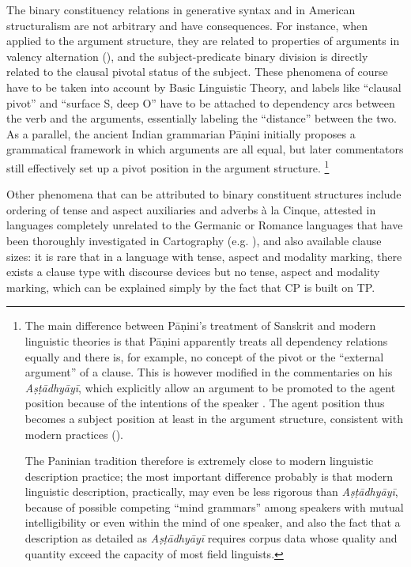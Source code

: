 \documentclass[UTF8, a4paper, oneside, scheme=plain, 12pt]{ctexrep}
\newcommand*{\citepages}[1]{pp.~{#1}}
\newcommand{\work}[1]{\textit{#1}}
\begin{document}
{The binary constituency relations in generative syntax and in American structuralism are not arbitrary and have consequences.
For instance, when applied to the argument structure,
they are related to properties of arguments in valency alternation (),
and the subject-predicate binary division is directly related to the clausal pivotal status of the subject.
These phenomena of course have to be taken into account by Basic Linguistic Theory,
and labels like ``clausal pivot'' and ``surface S, deep O'' have to be attached to dependency arcs between the verb and the arguments,
essentially labeling the ``distance'' between the two. 
As a parallel, the ancient Indian grammarian Pāṇini initially proposes a grammatical framework in which arguments are all equal, but later commentators still effectively set up a pivot position in the argument structure.%
\footnote{
    The main difference between Pāṇini's treatment of Sanskrit and modern linguistic theories
    is that Pāṇini apparently treats all dependency relations equally
    and there is, for example, no concept of the pivot or the ``external argument'' of a clause.
    This is however modified in the commentaries on his \work{Aṣṭādhyāyī},
    which explicitly allow an argument to be promoted to the agent position
    because of the intentions of the speaker \citep{keidan2017subjecthood}.
    The agent position thus becomes a subject position at least in the argument structure, consistent with modern practices ().

    The Paninian tradition therefore is extremely close to modern linguistic description practice;
    the most important difference probably is that
    modern linguistic description, practically, may even be less rigorous than \work{Aṣṭādhyāyī},
    because of possible competing ``mind grammars'' among speakers with mutual intelligibility
    or even within the mind of one speaker,
    and also the fact that a description as detailed as \work{Aṣṭādhyāyī}
    requires corpus data whose quality and quantity exceed the capacity of most field linguists.
}

Other phenomena that can be attributed to binary constituent structures include
ordering of tense and aspect auxiliaries and adverbs à la Cinque, attested in languages completely unrelated to the Germanic or Romance languages that have been thoroughly investigated in Cartography (e.g. \citealt[\citepages{166-167}]{grimm2021grammar}),
and also available clause sizes: it is rare that in a language with tense, aspect and modality marking,
there exists a clause type with discourse devices but no tense, aspect and modality marking,
which can be explained simply by the fact that CP is built on TP.

}
\end{document}
